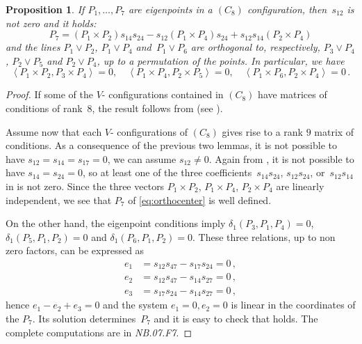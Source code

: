 \documentclass[a4paper, 11pt, reqno]{amsart}
\theoremstyle{plain}
\newtheorem{prop}[lemma]{Proposition}
\theoremstyle{definition}
\newcommand{\nb}[2]{\textsl{{NB}.{#1}.{#2}}}
\newcommand{\scl}[2]{\left\langle {#1}, {#2} \right\rangle}
\begin{document}
\begin{prop}
\label{proposition:conf8_partA}
If $P_1, \dotsc, P_7$ are eigenpoints in a $(C_8)$ configuration, then~$s_{12}$ is not zero and it holds:
\begin{equation}
\label{eq:orthocenter}
P_7 = (P_1 \times P_2)s_{14}s_{24} -
  s_{12}(P_1 \times P_4)s_{24} + s_{12}s_{14}(P_2 \times P_4)
\end{equation}
and the lines $P_1 \vee P_2$, $P_1 \vee P_4$ and~$P_1 \vee P_6$
are orthogonal to, respectively, $P_3 \vee P_4$, $P_2 \vee P_5$ and 
$P_2 \vee P_4$, up to a permutation of 
the points. In particular, we have
%
\[
  \scl{P_1 \times P_2}{P_3 \times P_4} = 0, \quad 
  \scl{P_1 \times P_4}{P_2 \times P_5} = 0, \quad 
  \scl{P_1 \times P_6}{P_2 \times P_4} = 0 \,.
\]
%
\end{prop}
\begin{proof}
If some of the $V$- configurations contained in $(C_8)$ have matrices of conditions of rank~$8$, 
the result follows from  (see ).

Assume now that each $V$- configurations of $(C_8)$ gives rise to a rank $9$ matrix of conditions.
As a consequence of the previous two lemmas, it is not possible
to have $s_{12}=s_{14}=s_{17}=0$, we can assume $s_{12} \not=0$.
Again from , it is not possible to 
have $s_{14}=s_{24}=0$, so at least one of the three coefficients~$s_{14}s_{24}$, $s_{12}s_{24}$, or~$s_{12}s_{14}$ in  is not zero. Since the 
three vectors $P_1\times P_2$, $P_1\times P_4$, $P_2\times P_4$ are linearly independent, we see that $P_7$ of \eqref{eq:orthocenter} is well defined. 

On the other hand, the eigenpoint conditions imply
$\delta_1(P_3, P_1, P_4) = 0$, $\delta_1(P_5, P_1, P_2) = 0$ and 
$\delta_1(P_6, P_1, P_2)=0$. These three relations, up to non zero factors, can be expressed as 
%
\begin{align*}
 e_1 &= s_{12}s_{47}-s_{17}s_{24} =0\,,\\
 e_2 &= s_{12}s_{47}-s_{14}s_{27} =0\,,\\ 
 e_3 &= s_{17}s_{24}-s_{14}s_{27} =0\,,
\end{align*}
%
hence $e_1-e_2+e_3 = 0$ and the system
$e_1=0, e_2 = 0$ is linear in the coordinates of the $P_7$. 
Its solution determines~$P_7$ and it is easy to check that  holds. The complete computations are in \nb{07}{F7}.
\end{proof}
\end{document}
